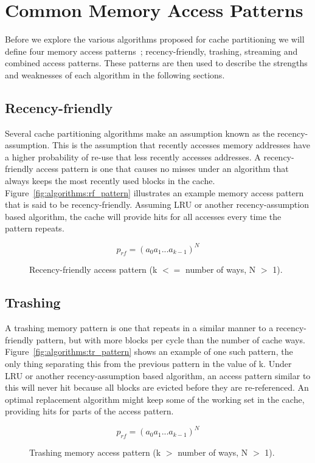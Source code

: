 \section{Common Memory Access Patterns}
Before we explore the various algorithms proposed for cache partitioning we will define four memory access patterns~\cite{Jaleel2010}; recency-friendly, trashing, streaming and combined access patterns.
These patterns are then used to describe the strengths and weaknesses of each algorithm in the following sections.

\subsection{Recency-friendly}
Several cache partitioning algorithms make an assumption known as the recency-assumption.
This is the assumption that recently accesses memory addresses have a higher probability of re-use that less recently accesses addresses.
A recency-friendly access pattern is one that causes no misses under an algorithm that always keeps the most recently used blocks in the cache.
Figure~\ref{fig:algorithms:rf_pattern} illustrates an example memory access pattern that is said to be recency-friendly.
Assuming LRU or another recency-assumption based algorithm, the cache will provide hits for all accesses every time the pattern repeats.

\begin{figure}[ht]
\centering
\begin{equation} \label{fig:algorithms:rf_pattern}
p_{rf} = (a_0 a_1 ... a_{k-1})^N
\end{equation}
\caption{Recency-friendly access pattern (k $<=$ number of ways, N $>$ 1).}
\end{figure}

\subsection{Trashing}
A trashing memory pattern is one that repeats in a similar manner to a recency-friendly pattern, but with more blocks per cycle than the number of cache ways. 
Figure~\ref{fig:algorithms:tr_pattern} shows an example of one such pattern, the only thing separating this from the previous pattern in the value of k.
Under LRU or another recency-assumption based algorithm, an access pattern similar to this will never hit because all blocks are evicted before they are re-referenced.
An optimal replacement algorithm might keep some of the working set in the cache, providing hits for parts of the access pattern.
\begin{figure}[ht]
\centering
\begin{equation} \label{fig:algorithms:tr_pattern}
p_{rf} = (a_0 a_1 ... a_{k-1})^N
\end{equation}
\caption{Trashing memory access pattern (k $>$ number of ways, N $>$ 1).}
\end{figure}

